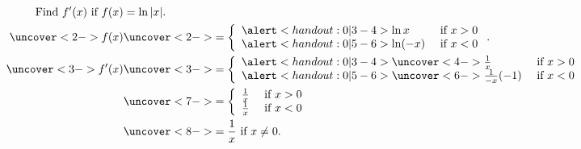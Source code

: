 \begin{frame}
\begin{example}
\abovedisplayskip=0pt
\belowdisplayskip=0pt
\abovedisplayshortskip=0pt
\belowdisplayshortskip=0pt
\begin{align*}
\text{Find $f'(x)$ if } f(x) & = \ln |x|.\\
\uncover<2->{%
f(x) %
}%
& \uncover<2->{
 = \left\{ \begin{array}{lr}
\alert<handout:0| 3-4>{\ln x} & \text{ if } x > 0 \\
\alert<handout:0| 5-6>{\ln (-x)} & \text{ if } x < 0 \\
\end{array}\right. .
}\\%
\uncover<3->{%
f'(x) %
}%
& \uncover<3->{
 = \left\{ \begin{array}{lr}
\alert<handout:0| 3-4>{\uncover<4->{\frac{1}{x}}} & \text{ if } x > 0 \\
\alert<handout:0| 5-6>{\uncover<6->{\frac{1}{-x}(-1)}} & \text{ if } x < 0 \\
\end{array}\right.
}\\%
& \uncover<7->{
 = \left\{ \begin{array}{lr}
\frac{1}{x} & \text{ if } x > 0 \\
\frac{1}{x} & \text{ if } x < 0 \\
\end{array}\right.
}\\%
& \uncover<8->{%
 = \frac{1}{x} \text{ if } x \neq 0.
}%
\end{align*}
\end{example}
\end{frame}
